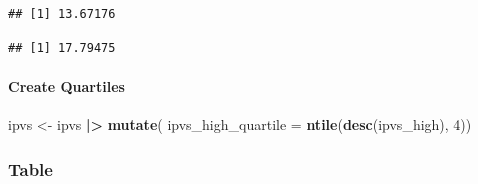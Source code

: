 \documentclass[
]{article}
\newenvironment{Shaded}{\begin{snugshade}}{\end{snugshade}}
\newcommand{\AttributeTok}[1]{\textcolor[rgb]{0.13,0.29,0.53}{#1}}
\newcommand{\DecValTok}[1]{\textcolor[rgb]{0.00,0.00,0.81}{#1}}
\newcommand{\FunctionTok}[1]{\textcolor[rgb]{0.13,0.29,0.53}{\textbf{#1}}}
\newcommand{\NormalTok}[1]{#1}
\newcommand{\OtherTok}[1]{\textcolor[rgb]{0.56,0.35,0.01}{#1}}
\newcommand{\SpecialCharTok}[1]{\textcolor[rgb]{0.81,0.36,0.00}{\textbf{#1}}}
\begin{document}
\begin{verbatim}
## [1] 13.67176
\end{verbatim}

\begin{Shaded}
\end{Shaded}

\begin{verbatim}
## [1] 17.79475
\end{verbatim}

\paragraph{Create Quartiles}\label{create-quartiles}

\begin{Shaded}
\begin{Highlighting}[]
\NormalTok{ipvs }\OtherTok{\textless{}{-}}\NormalTok{ ipvs }\SpecialCharTok{|\textgreater{}}
  \FunctionTok{mutate}\NormalTok{(}
    \AttributeTok{ipvs\_high\_quartile =} \FunctionTok{ntile}\NormalTok{(}\FunctionTok{desc}\NormalTok{(ipvs\_high), }\DecValTok{4}\NormalTok{))}
\end{Highlighting}
\end{Shaded}

\subsubsection{Table}\label{table}
\end{document}
